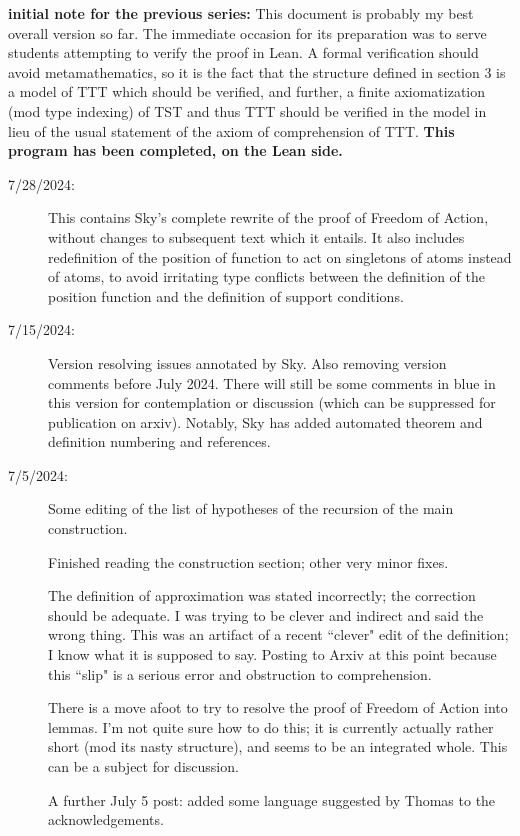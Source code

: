\documentclass[112pt]{article}
\theoremstyle{definition}
\theoremstyle{remark}
\begin{document}
{\bf initial note for the previous series:}  This document is probably my best overall version so far.  The immediate occasion for its preparation was to serve students attempting to verify the proof in Lean.  A formal verification should avoid metamathematics, so it is the fact that the structure defined in section 3 is a model of TTT which should be verified, and further, a finite axiomatization (mod type indexing) of TST and thus TTT should be verified in the model in lieu of the usual statement of the axiom of comprehension of TTT.  {\bf This program has been completed, on the Lean side.}
\begin{description}

\item[7/28/2024:]  This contains Sky's complete rewrite of the proof of Freedom of Action, without changes to subsequent text which it entails.  It also includes
redefinition of the position of function to act on singletons of atoms instead of atoms, to avoid irritating type conflicts between the definition of the position function
and the definition of support conditions.

\item[7/15/2024:]  Version resolving issues annotated by Sky.  Also removing version comments before July 2024.  There will still be some comments in blue in this version for contemplation or discussion (which can be suppressed for publication on arxiv).  Notably, Sky has added automated theorem and definition numbering and references.

\item[7/5/2024:]  Some editing of the list of hypotheses of the recursion of the main construction.

Finished reading the construction section;  other very minor fixes.

The definition of approximation was stated incorrectly;  the correction should be adequate.  I was trying to be clever and indirect and said the wrong thing.  This was an artifact of a recent ``clever" edit of the definition; I know what it is supposed to say.  Posting to Arxiv at this point because this ``slip" is a serious error and obstruction to comprehension.

There is a move afoot to try to resolve the proof of Freedom of Action into lemmas.  I'm not quite sure how to do this;  it is currently actually rather short (mod its nasty structure), and seems to be an integrated whole.  This can be a subject for discussion.

A further July 5 post: added some language suggested by Thomas to the acknowledgements.


\end{description}
\end{document}
